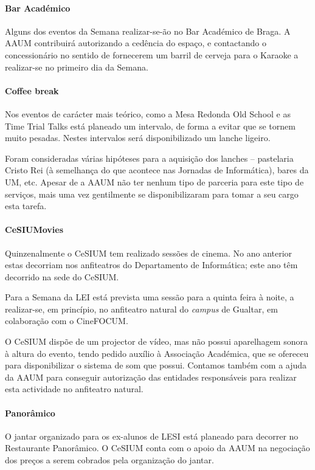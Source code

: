 \paragraph{Bar Académico}
Alguns dos eventos da Semana realizar-se-ão no Bar Académico de Braga. A AAUM contribuirá autorizando a cedência do espaço, e contactando o concessionário no sentido de fornecerem um barril de cerveja para o Karaoke a realizar-se no primeiro dia da Semana.

\paragraph{Coffee break}
Nos eventos de carácter mais teórico, como a Mesa Redonda Old School e as Time Trial Talks está planeado um intervalo, de forma a evitar que se tornem muito pesadas.
Nestes intervalos será disponibilizado um lanche ligeiro.

Foram consideradas várias hipóteses para a aquisição dos lanches -- pastelaria Cristo Rei (à semelhança do que acontece nas Jornadas de Informática), bares da UM, etc.
Apesar de a AAUM não ter nenhum tipo de parceria para este tipo de serviços, mais uma vez gentilmente se disponibilizaram para tomar a seu cargo esta tarefa.

\paragraph{CeSIUMovies}
Quinzenalmente o CeSIUM tem realizado sessões de cinema. No ano anterior estas decorriam nos anfiteatros do Departamento de Informática; este ano têm decorrido na sede do CeSIUM.

Para a Semana da LEI está prevista uma sessão para a quinta feira à noite, a realizar-se, em princípio, no anfiteatro natural do \emph{campus} de Gualtar, em colaboração com o CineFOCUM.

O CeSIUM dispõe de um projector de vídeo, mas não possui aparelhagem sonora à altura do evento, tendo pedido auxílio à Associação Académica, que se ofereceu para disponibilizar o sistema de som que possui. Contamos também com a ajuda da AAUM para conseguir autorização das entidades responsáveis para realizar esta actividade no anfiteatro natural.

\paragraph{Panorâmico}
O jantar organizado para os ex-alunos de LESI está planeado para decorrer no Restaurante Panorâmico. O CeSIUM conta com o apoio da AAUM na negociação dos preços a serem cobrados pela organização do jantar.





